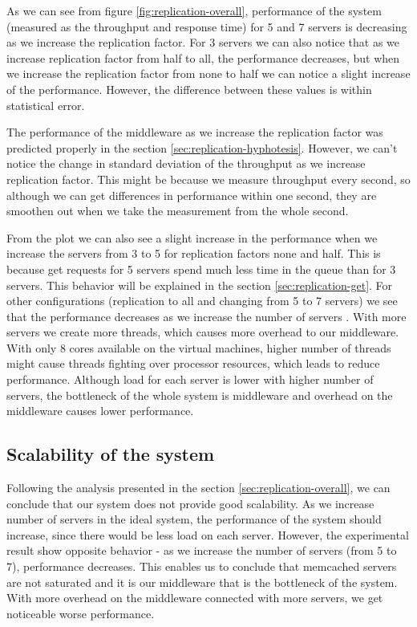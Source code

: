 \documentclass[11pt]{article}
\begin{document}
As we can see from figure \ref{fig:replication-overall}, performance of the system (measured as the throughput and response time) for 5 and 7 servers is decreasing as we increase the replication factor. For 3 servers we can also notice that as we increase replication factor from half to all, the performance decreases, but when we increase the replication factor from none to half we can notice a slight increase of the performance. However, the difference between these values is within statistical error.

The performance of the middleware as we increase the replication factor was predicted properly in the section \ref{sec:replication-hyphotesis}. However, we can't notice the change in standard deviation of the throughput as we increase replication factor. This might be because we measure throughput every second, so although we can get differences in performance within one second, they are smoothen out when we take the measurement from the whole second.

From the plot we can also see a slight increase in the performance when we increase the servers from 3 to 5 for replication factors none and half. This is because get requests for 5 servers spend much less time in the queue than for 3 servers. This behavior will be explained in the section \ref{sec:replication-get}. For other configurations (replication to all and changing from 5 to 7 servers) we see that the performance decreases as we increase the number of servers . With more servers we create more threads, which causes more overhead to our middleware. With only 8 cores available on the virtual machines, higher number of threads might cause threads fighting over processor resources, which leads to reduce performance. Although load for each server is lower with higher number of servers, the bottleneck of the whole system is middleware and overhead on the middleware causes lower performance.

\subsection{Scalability of the system}
Following the analysis presented in the section \ref{sec:replication-overall}, we can conclude that our system does not provide good scalability. As we increase number of servers in the ideal system, the performance of the system should increase, since there would be less load on each server. However, the experimental result show opposite behavior - as we increase the number of servers (from 5 to 7), performance decreases. This enables us to conclude that memcached servers are not saturated and it is our middleware that is the bottleneck of the system. With more overhead on the middleware connected with more servers, we get noticeable worse performance.
\end{document}
